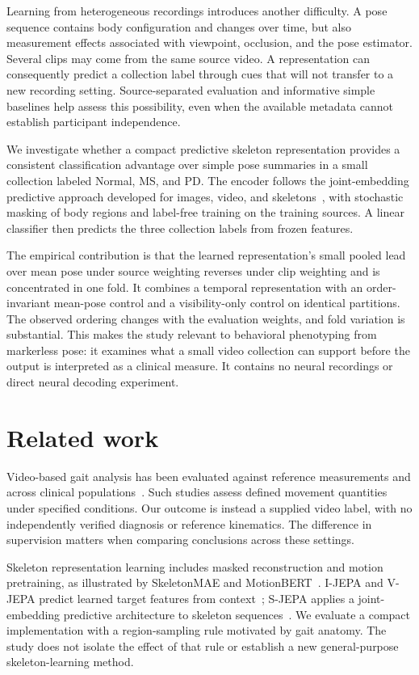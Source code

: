 \documentclass[10pt,twocolumn,letterpaper]{article}
\begin{document}
Learning from heterogeneous recordings introduces another difficulty. A pose sequence contains body configuration and changes over time, but also measurement effects associated with viewpoint, occlusion, and the pose estimator. Several clips may come from the same source video. A representation can consequently predict a collection label through cues that will not transfer to a new recording setting. Source-separated evaluation and informative simple baselines help assess this possibility, even when the available metadata cannot establish participant independence.

We investigate whether a compact predictive skeleton representation provides a consistent classification advantage over simple pose summaries in a small collection labeled Normal, MS, and PD. The encoder follows the joint-embedding predictive approach developed for images, video, and skeletons~\cite{ijepa,vjepa,sjepa}, with stochastic masking of body regions and label-free training on the training sources. A linear classifier then predicts the three collection labels from frozen features.

The empirical contribution is that the learned representation's small pooled lead over mean pose under source weighting reverses under clip weighting and is concentrated in one fold. It combines a temporal representation with an order-invariant mean-pose control and a visibility-only control on identical partitions. The observed ordering changes with the evaluation weights, and fold variation is substantial. This makes the study relevant to behavioral phenotyping from markerless pose: it examines what a small video collection can support before the output is interpreted as a clinical measure. It contains no neural recordings or direct neural decoding experiment.

\section{Related work}
Video-based gait analysis has been evaluated against reference measurements and across clinical populations~\cite{stenum2021,stenum2024}. Such studies assess defined movement quantities under specified conditions. Our outcome is instead a supplied video label, with no independently verified diagnosis or reference kinematics. The difference in supervision matters when comparing conclusions across these settings.

Skeleton representation learning includes masked reconstruction and motion pretraining, as illustrated by SkeletonMAE and MotionBERT~\cite{skeletonmae,motionbert}. I-JEPA and V-JEPA predict learned target features from context~\cite{ijepa,vjepa}; S-JEPA applies a joint-embedding predictive architecture to skeleton sequences~\cite{sjepa}. We evaluate a compact implementation with a region-sampling rule motivated by gait anatomy. The study does not isolate the effect of that rule or establish a new general-purpose skeleton-learning method.
\end{document}
